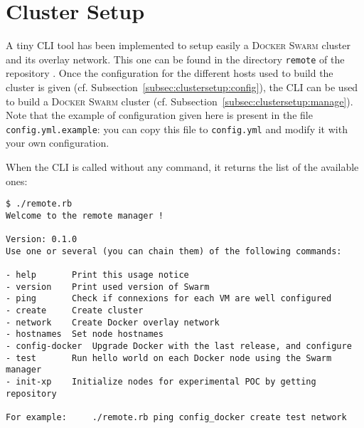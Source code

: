 
\section{Cluster Setup}
\label{sec:clustersetup}

A tiny CLI tool has been implemented to setup easily a \textsc{Docker Swarm} cluster and its overlay network.
This one can be found in the directory \texttt{remote} of the repository \securestreamrepo{}.
Once the configuration for the different hosts used to build the cluster is given (cf. Subsection~\ref{subsec:clustersetup:config}), the CLI can be used to build a \textsc{Docker Swarm} cluster (cf. Subsection~\ref{subsec:clustersetup:manage}).
Note that the example of configuration given here is present in the file \texttt{config.yml.example}: you can copy this file to \texttt{config.yml} and modify it with your own configuration.

When the CLI is called without any command, it returns the list of the available ones:

\begin{lstlisting}[basicstyle=\small]
$ ./remote.rb
Welcome to the remote manager !

Version: 0.1.0
Use one or several (you can chain them) of the following commands:

- help		 Print this usage notice
- version	 Print used version of Swarm
- ping		 Check if connexions for each VM are well configured
- create	 Create cluster
- network	 Create Docker overlay network
- hostnames	 Set node hostnames
- config-docker	 Upgrade Docker with the last release, and configure
- test		 Run hello world on each Docker node using the Swarm manager
- init-xp	 Initialize nodes for experimental POC by getting repository

For example:	 ./remote.rb ping config_docker create test network
\end{lstlisting}

\newpage



\newpage


